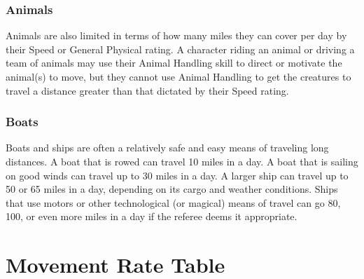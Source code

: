 \documentclass[oneside]{book}
\begin{document}
\begin{multicols}{2}
\subsubsection{Animals}
Animals are also limited in terms of how many miles they can cover per day by their Speed or General Physical rating. A character riding an animal or driving a team of animals may use their Animal Handling skill to direct or motivate the animal(s) to move, but they cannot use Animal Handling to get the creatures to travel a distance greater than that dictated by their Speed rating.

\subsubsection{Boats}
Boats and ships are often a relatively safe and easy means of traveling long distances. A boat that is rowed can travel 10 miles in a day. A boat that is sailing on good winds can travel up to 30 miles in a day. A larger ship can travel up to 50 or 65 miles in a day, depending on its cargo and weather conditions. Ships that use motors or other technological (or magical) means of travel can go 80, 100, or even more miles in a day if the referee deems it appropriate. 

\section{Movement Rate Table}


\end{multicols}
\end{document}
